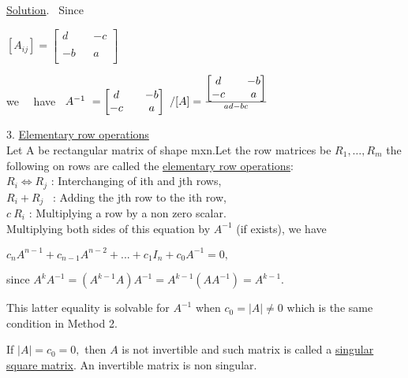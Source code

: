 \documentclass[11pt]{amsbook}
\newcommand\tal[1][0.5cm]{\hspace*{#1}}
\begin{document}
\underline{Solution}. \ Since
\begin{center}
$ [A_{ij}] = 
$$
	\begin{bmatrix}

		d  &&   -c      \\
		\\
		-b  &&   a      \\ 

	\end{bmatrix}
 $$ 
 $
 \end{center}
 
 
we \ \  have \ $
A^{-1} \ =
	\begin{bmatrix}
		d  &&   -b      \\
		-c  &&   a      \\
	\end{bmatrix} \ 
/[A]  = \frac{
	\begin{bmatrix}
	d  &&   -b      \\
	-c  &&   a      
	\end{bmatrix}}
	{ ad-bc }
\\
$

\tal 3.  \underline{Elementary row operations}\\
\setlength{\parindent}{7ex} 
\tal Let A be rectangular matrix of shape mxn.Let the row matrices be  $  R_1, \ldots, R_m
$ the following on rows are called  the \underline{elementary row operations}:  \\
\tal $ R_i \Leftrightarrow R_j  $ : Interchanging of ith and jth rows,\\
\tal $ R_i + R_j  $ \ : Adding the jth row to the ith row,\\
\tal $ c \ R_i $ \qquad : Multiplying a row by a non zero scalar.\\
\hNewLine
\null Multiplying both sides of this equation by $A^{-1}$ (if exists), we have
\hNewLine
	\begin{center}
	$c_nA^{n-1}+c_{n-1}A^{n-2}+...+c_1I_n+c_0A^{-1}=0,$
	\end{center}
\hNewLine
since $A^kA^{-1}=(A^{k-1}A)A^{-1}=A^{k-1}(AA^{-1})=A^{k-1}.$
\hNewLine
\par This latter equality is solvable for $A^{-1}$ when $c_0=\left|A\right|\neq0$ which is the same condition in Method 2.
\hNewLine
\par If $\left|A\right|=c_0=0,$ then $A$ is not invertible and such matrix is called a \underline{singular square matrix}. An invertible matrix is non singular.
\hNewLine
\end{document}
